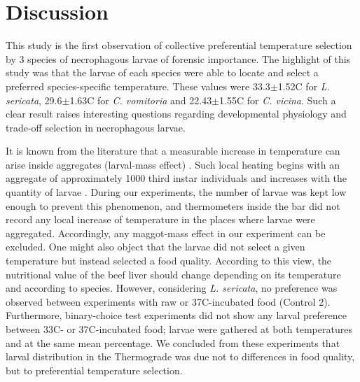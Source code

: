   
	\section{Discussion}    
  
This study is the first observation of collective preferential temperature selection by 3 species of necrophagous larvae of forensic importance. The highlight of this study was that the larvae of each species were able to locate and select a preferred species-specific temperature. These values were 33.3$\pm$1.52C for \textit{L. sericata}, 29.6$\pm$1.63C for \textit{C. vomitoria} and 22.43$\pm$1.55C for \textit{C. vicina}. Such a clear result raises interesting questions regarding developmental physiology and trade-off selection in necrophagous larvae.

It is known from the literature that a measurable increase in temperature can arise inside aggregates (larval-mass effect) \citep{slone_thermoregulation_2007,charabidze_larval-mass_2011}. Such local heating begins with an aggregate of approximately 1000 third instar individuals and increases with the quantity of larvae \cite{heaton_quantifying_2014}. During our experiments, the number of larvae was kept low enough to prevent this phenomenon, and thermometers inside the bar did not record any local increase of temperature in the places where larvae were aggregated. Accordingly, any maggot-mass effect in our experiment can be excluded. One might also object that the larvae did not select a given temperature but instead selected a food quality. According to this view, the nutritional value of the beef liver should change depending on its temperature and according to species. However, considering \textit{L. sericata}, no preference was observed between experiments with raw or 37C-incubated food (Control 2). Furthermore, binary-choice test experiments did not show any larval preference between 33C- or 37C-incubated food; larvae were gathered at both temperatures and at the same mean percentage. We concluded from these experiments that larval distribution in the Thermograde was due not to differences in food quality, but to preferential temperature selection.


